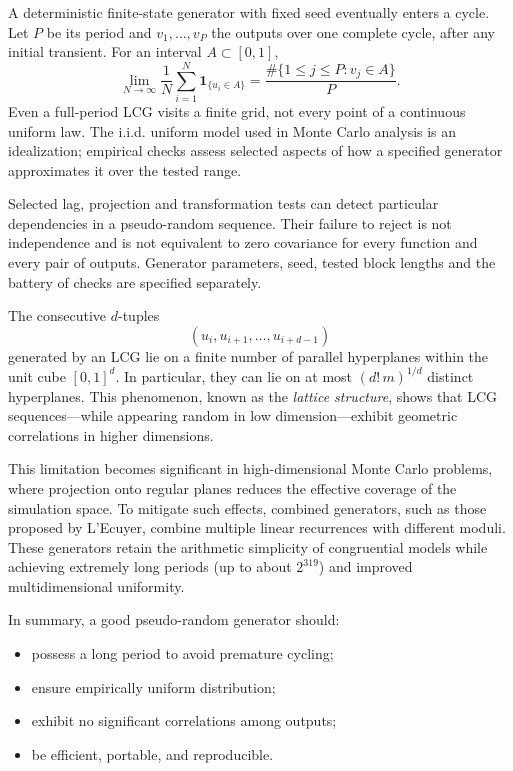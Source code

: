 \begin{remark}
A deterministic finite-state generator with fixed seed eventually
enters a cycle. Let $P$ be its period and $v_1,\ldots,v_P$ the
outputs over one complete cycle, after any initial transient. For
an interval $A\subset[0,1]$,
\[
\lim_{N\to\infty}\frac1N\sum_{i=1}^N\mathbf1_{\{u_i\in A\}}
=\frac{\#\{1\le j\le P:v_j\in A\}}{P}.
\]
Even a full-period LCG visits a finite grid, not every point of a
continuous uniform law. The i.i.d. uniform model used in Monte Carlo
analysis is an idealization; empirical checks assess selected aspects
of how a specified generator approximates it over the tested range.
\end{remark}

\begin{remark}
Selected lag, projection and transformation tests can detect particular
dependencies in a pseudo-random sequence. Their failure to reject is
not independence and is not equivalent to zero covariance for every
function and every pair of outputs. Generator parameters, seed, tested
block lengths and the battery of checks are specified separately.
\end{remark}

\begin{theorem}
The consecutive \(d\)-tuples
\[
(u_i, u_{i+1}, \dots, u_{i+d-1})
\]
generated by an LCG lie on a finite number of parallel hyperplanes within the unit cube \([0,1]^d\). 
In particular, they can lie on at most \((d! \, m)^{1/d}\) distinct hyperplanes. 
This phenomenon, known as the \emph{lattice structure}, shows that LCG sequences—while appearing random in low dimension—exhibit geometric correlations in higher dimensions.
\end{theorem}

This limitation becomes significant in high-dimensional Monte Carlo problems, where projection onto regular planes reduces the effective coverage of the simulation space. 
To mitigate such effects, combined generators, such as those proposed by L’Ecuyer, combine multiple linear recurrences with different moduli. 
These generators retain the arithmetic simplicity of congruential models while achieving extremely long periods (up to about \(2^{319}\)) and improved multidimensional uniformity.

In summary, a good pseudo-random generator should:
\begin{itemize}
    \item possess a long period to avoid premature cycling;
    \item ensure empirically uniform distribution;
    \item exhibit no significant correlations among outputs;
    \item be efficient, portable, and reproducible.
\end{itemize}

